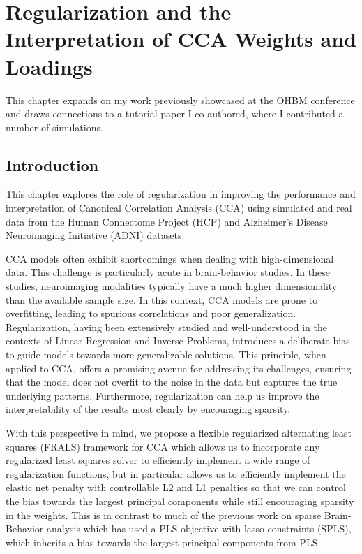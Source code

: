 \chapter{Regularization and the Interpretation of CCA Weights and Loadings}\label{chap:als}
\minitoc
This chapter expands on my work previously showcased at the OHBM conference and draws connections to a tutorial paper I co-authored, where I contributed a number of simulations\citep{mihalik2022canonical}.

\section{Introduction}\label{sec:introduction}

This chapter explores the role of regularization in improving the performance and interpretation of Canonical
Correlation Analysis (CCA) using simulated and real data from the Human Connectome Project (HCP) and Alzheimer's Disease Neuroimaging Initiative (ADNI) datasets.

CCA models often exhibit shortcomings when dealing with high-dimensional data.
This challenge is particularly acute in brain-behavior studies.
In these studies, neuroimaging modalities typically have a much higher dimensionality than the available sample size.
In this context, CCA models are prone to overfitting, leading to spurious correlations and poor generalization.
Regularization, having been extensively studied and well-understood in the contexts of Linear Regression and Inverse Problems, introduces a deliberate bias to guide models towards more generalizable solutions.
This principle, when applied to CCA, offers a promising avenue for addressing its challenges, ensuring that the model does not overfit to the noise in the data but captures the true underlying patterns.
Furthermore, regularization can help us improve the interpretability of the results most clearly by encouraging sparsity.

With this perspective in mind, we propose a flexible regularized alternating least squares (FRALS) framework for CCA which allows us to incorporate any regularized least squares solver to efficiently implement a wide range of regularization functions, but in particular allows us to efficiently implement the elastic net penalty with controllable L2 and L1 penalties so that we can control the bias towards the largest principal components while still encouraging sparsity in the weights.
This is in contrast to much of the previous work on sparse Brain-Behavior analysis which has used a PLS objective with lasso constraints (SPLS), which inherits a bias towards the largest principal components from PLS.

